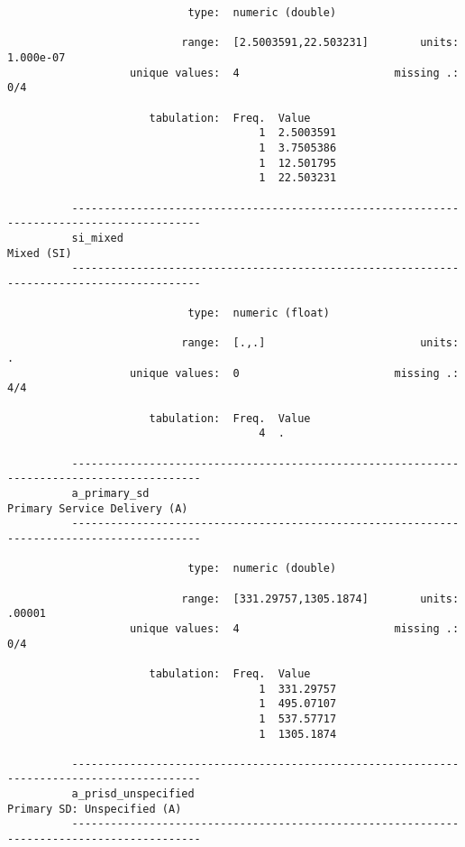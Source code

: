 \documentclass{article}
\begin{document}
\begin{verbatim}
                            type:  numeric (double)
          
                           range:  [2.5003591,22.503231]        units:  1.000e-07
                   unique values:  4                        missing .:  0/4
          
                      tabulation:  Freq.  Value
                                       1  2.5003591
                                       1  3.7505386
                                       1  12.501795
                                       1  22.503231
          
          ------------------------------------------------------------------------------------------
          si_mixed                                                                        Mixed (SI)
          ------------------------------------------------------------------------------------------
          
                            type:  numeric (float)
          
                           range:  [.,.]                        units:  .
                   unique values:  0                        missing .:  4/4
          
                      tabulation:  Freq.  Value
                                       4  .
          
          ------------------------------------------------------------------------------------------
          a_primary_sd                                                  Primary Service Delivery (A)
          ------------------------------------------------------------------------------------------
          
                            type:  numeric (double)
          
                           range:  [331.29757,1305.1874]        units:  .00001
                   unique values:  4                        missing .:  0/4
          
                      tabulation:  Freq.  Value
                                       1  331.29757
                                       1  495.07107
                                       1  537.57717
                                       1  1305.1874
          
          ------------------------------------------------------------------------------------------
          a_prisd_unspecified                                            Primary SD: Unspecified (A)
          ------------------------------------------------------------------------------------------
          

\end{verbatim}
\end{document}
